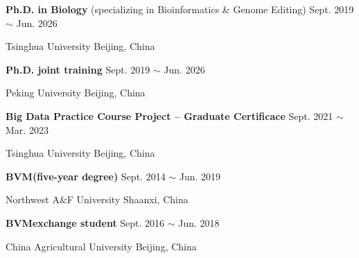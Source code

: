 

\renewcommand{\thefootnote}{\fnsymbol{footnote}}
\setcounter{footnote}{0}
    \textbf{Ph.D. in Biology\footnotemark[1]} (specializing in Bioinformatics \& Genome Editing) \hfill Sept. 2019 $\sim$ Jun. 2026\footnotemark[2]

    Tsinghua University \hfill Beijing, China
    
    \textbf{Ph.D. joint training\footnotemark[1]} \hfill Sept. 2019 $\sim$ Jun. 2026\footnotemark[2]
    
    Peking University \hfill Beijing, China

    \textbf{Big Data Practice Course Project -- Graduate Certificace} \hfill Sept. 2021 $\sim$ Mar. 2023
    
    Tsinghua University \hfill Beijing, China

    \textbf{BVM\footnotemark[3] (five-year degree)} \hfill Sept. 2014 $\sim$ Jun. 2019
    
    Northwest A\&F University \hfill Shaanxi, China

    \textbf{BVM\footnotemark[3] exchange student} \hfill Sept. 2016 $\sim$ Jun. 2018
    
    China Agricultural University \hfill Beijing, China

\renewcommand{\thefootnote}{\arabic{footnote}}
\setcounter{footnote}{1}
